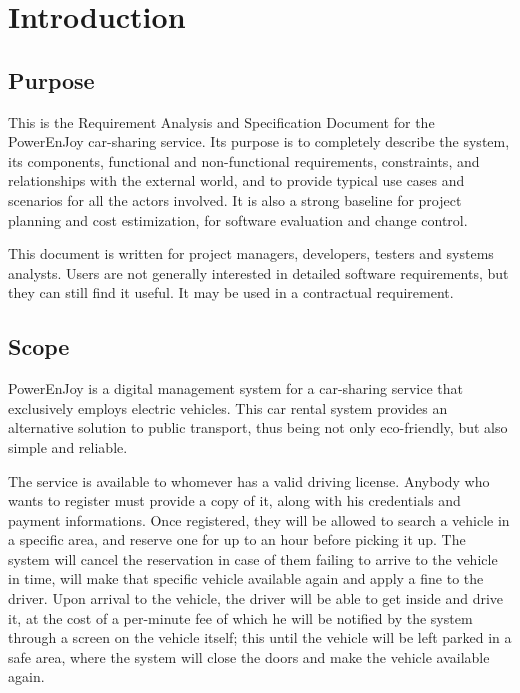 \section{Introduction}\label{sec introduction}

\subsection{Purpose}

This is the  Requirement Analysis and Specification Document for the PowerEnJoy car-sharing service.
Its purpose is to completely describe the system, its components, functional and non-functional requirements, constraints, and relationships with the external world, and to provide typical use cases and scenarios for all the actors involved. It is also a strong baseline for project planning and cost estimization, for software evaluation and change control.


This document is written for project managers, developers, testers and systems analysts. Users are not generally interested in detailed software requirements, but they can still find it useful. It may be used in a contractual requirement.

\subsection{Scope}

PowerEnJoy is a digital management system for a car-sharing service that exclusively employs electric vehicles. This car rental system provides an alternative solution to public transport, thus being not only eco-friendly, but also simple and reliable.

The service is available to whomever has a valid driving license. Anybody who wants to register must provide a copy of it, along with his credentials and payment informations.
Once registered, they will be allowed to search a vehicle in a specific area, and reserve one for up to an hour before picking it up. The system will cancel the reservation in case of them failing to arrive to the vehicle in time, will make that specific vehicle available again and apply a fine to the driver.
Upon arrival to the vehicle, the driver will be able to get inside and drive it, at the cost of a per-minute fee of which he will be notified by the system through a screen on the vehicle itself; this until the vehicle will be left parked in a safe area, where the system will close the doors and make the vehicle available again.


